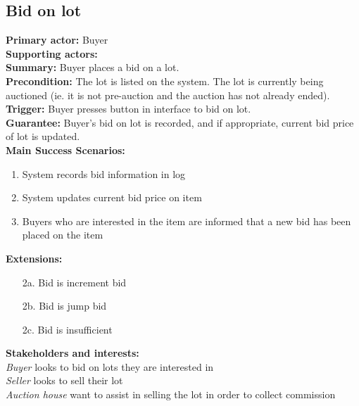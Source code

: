 \documentclass[titlepage, 12pt]{extarticle}
\begin{document}
\subsection{Bid on lot}
{\bf Primary actor: } Buyer
\\{\bf Supporting actors: } 
\\{\bf Summary: } Buyer places a bid on a lot.
\\{\bf Precondition: } The lot is listed on the system. The lot is currently being auctioned (ie. it is not pre-auction and the auction has not already ended).  
\\{\bf Trigger: } Buyer presses button in interface to bid on lot.
\\{\bf Guarantee: } Buyer's bid on lot is recorded, and if appropriate, current bid price of lot is updated. 
\\{\bf Main Success Scenarios: } 
\begin{enumerate}
\item System records bid information in log
\item System updates current bid price on item 
\item Buyers who are interested in the item are informed that a new bid has been placed on the item
\end{enumerate}
  {\bf Extensions: }
\begin{itemize}
\item [2a.] Bid is increment bid
\item [2b.] Bid is jump bid 
\item [2c.] Bid is insufficient
\end{itemize}
{\bf Stakeholders and interests: }
\\{\em Buyer} looks to bid on lots they are interested in
\\{\em Seller} looks to sell their lot
\\{\em Auction house} want to assist in selling the lot in order to collect commission 
\end{document}
